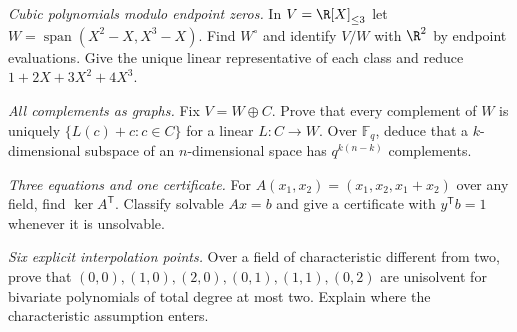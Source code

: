 \begin{exercise}[$\star\star$]\label{ex:v8cAa}
\emph{Cubic polynomials modulo endpoint zeros.} In $V=\R[X]_{\le3}$ let $W=\operatorname{span}(X^2-X,X^3-X)$. Find $W^\circ$ and identify $V/W$ with $\R^2$ by endpoint evaluations. Give the unique linear representative of each class and reduce $1+2X+3X^2+4X^3$.
\end{exercise}
\begin{exercise}[$\star\star$]\label{ex:v8cAb}
\emph{All complements as graphs.} Fix $V=W\oplus C$. Prove that every complement of $W$ is uniquely $\{L(c)+c:c\in C\}$ for a linear $L:C\to W$. Over $\mathbb F_q$, deduce that a $k$-dimensional subspace of an $n$-dimensional space has $q^{k(n-k)}$ complements.
\end{exercise}
\begin{exercise}[$\star$]\label{ex:v8cAc}
\emph{Three equations and one certificate.} For $A(x_1,x_2)=(x_1,x_2,x_1+x_2)$ over any field, find $\ker A^{\mathsf T}$. Classify solvable $Ax=b$ and give a certificate with $y^{\mathsf T}b=1$ whenever it is unsolvable.
\end{exercise}
\begin{exercise}[$\star\star$]\label{ex:v8cAd}
\emph{Six explicit interpolation points.} Over a field of characteristic different from two, prove that $(0,0),(1,0),(2,0),(0,1),(1,1),(0,2)$ are unisolvent for bivariate polynomials of total degree at most two. Explain where the characteristic assumption enters.
\end{exercise}

